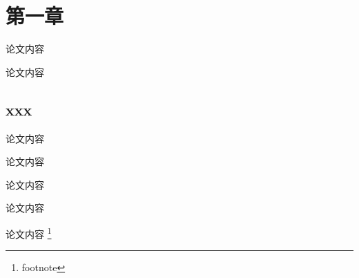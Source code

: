 \documentclass[a4paper,12pt,fontset=fandol]{ctexart}
\begin{document}
\makecoverpage

\section{第一章}

论文内容

论文内容

\subsection{xxx}
论文内容

论文内容

论文内容

论文内容

论文内容 \footnote{footnote}
\end{document}
